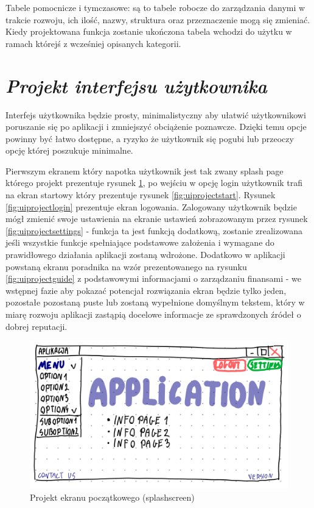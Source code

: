 \documentclass[a4paper,10pt, twoside]{report}
\newcommand{\customstylesection}[1]{\textbf{\textit{#1}}}
\begin{document}
\begin{large}
{Tabele pomocnicze i tymczasowe: są to tabele robocze do zarządzania danymi w 
trakcie rozwoju, ich ilość, nazwy, struktura oraz przeznaczenie mogą się 
zmieniać. Kiedy projektowana funkcja zostanie ukończona tabela wchodzi do użytku
 w ramach którejś z wcześniej opisanych kategorii.}

\section{\customstylesection{Projekt interfejsu użytkownika}}
{Interfejs użytkownika będzie prosty, minimalistyczny aby ułatwić użytkownikowi 
poruszanie się po aplikacji i zmniejszyć obciążenie poznawcze. Dzięki temu opcje
 powinny być łatwo dostępne, a ryzyko że użytkownik się pogubi lub przeoczy 
opcję której poszukuje minimalne.}

{Pierwszym ekranem który napotka użytkownik jest tak zwany splash page którego 
projekt prezentuje rysunek \ref*{fig:uiprojectsplash}, po wejściu w opcję login 
użytkownik trafi na ekran startowy który prezentuje rysunek 
\ref*{fig:uiprojectstart}. Rysunek \ref*{fig:uiprojectlogin} prezentuje ekran 
logowania. Zalogowany użytkownik będzie mógł zmienić swoje ustawienia na ekranie
 ustawień zobrazowanym przez rysunek \ref*{fig:uiprojectsettings} - funkcja ta 
jest funkcją dodatkową, zostanie zrealizowana jeśli wszystkie funkcje 
spełniające podstawowe założenia i wymagane do prawidłowego działania aplikacji 
zostaną wdrożone. Dodatkowo w aplikacji powstaną ekranu poradnika na wzór 
prezentowanego na rysunku \ref*{fig:uiprojectguide} z podstawowymi informacjami 
o zarządzaniu finansami - we wstępnej fazie aby pokazać potencjał rozwiązania 
ekran będzie tylko jeden, pozostałe pozostaną puste lub zostaną wypełnione 
domyślnym tekstem, który w miarę rozwoju aplikacji zastąpią docelowe informacje 
ze sprawdzonych źródeł o dobrej reputacji.}

\begin{figure}[H]           %
    \centering
    \includegraphics[width=12cm]{figures/Righten_UI_sketch_splashscreen.png}
    \caption{Projekt ekranu początkowego (splashscreen)}
    \label{fig:uiprojectsplash}
\end{figure}


\end{large}
\end{document}
